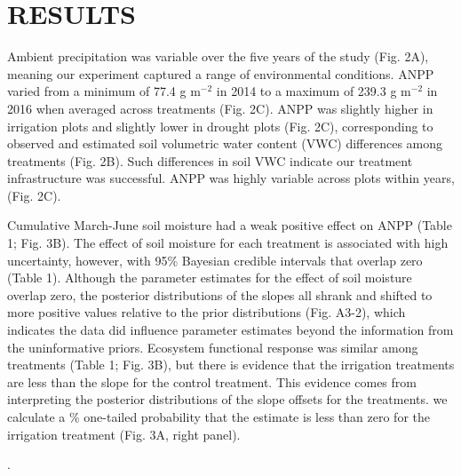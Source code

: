 \documentclass[fleqn,10pt,lineno]{wlpeerj} %
\begin{document}
\hypertarget{results}{%
\section{RESULTS}\label{results}}

Ambient precipitation was variable over the five years of the study
(Fig. 2A), meaning our experiment captured a range of environmental
conditions. ANPP varied from a minimum of 77.4 g m\(^{-2}\) in 2014 to a
maximum of 239.3 g m\(^{-2}\) in 2016 when averaged across treatments
(Fig. 2C). ANPP was slightly higher in irrigation plots
 and slightly lower in drought plots
 (Fig. 2C),
corresponding to observed and estimated soil volumetric water content
(VWC) differences among treatments (Fig. 2B).
Such differences in soil VWC indicate our treatment infrastructure was
successful. ANPP was highly variable across plots within years,
(Fig. 2C).

Cumulative March-June soil moisture had a weak positive effect on ANPP
(Table 1; Fig. 3B). The effect of soil moisture for each treatment is
associated with high uncertainty, however, with 95\% Bayesian credible
intervals that  overlap zero (Table 1). Although the
parameter estimates for the effect of soil moisture overlap zero, the
posterior distributions of the slopes all shrank and shifted to more
positive values relative to the prior distributions (Fig. A3-2), which
indicates the data did influence parameter estimates beyond the
information from the uninformative priors. Ecosystem functional response
was similar among treatments (Table 1; Fig. 3B), but there is evidence
that the  irrigation treatments are less
than the slope for the control treatment. This evidence comes from
interpreting the posterior distributions of the slope offsets for the
treatments.  we calculate a \%
one-tailed probability that the estimate is less than zero for the
irrigation treatment
(Fig. 3A, right panel).

.
\end{document}
